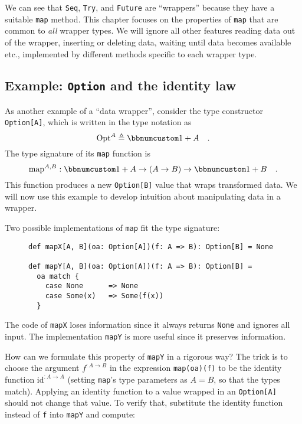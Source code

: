 We can see that \lstinline!Seq!, \lstinline!Try!, and \lstinline!Future!
are \textsf{``}wrappers\textsf{''} because they have a suitable \lstinline!map! method.
This chapter focuses on the properties of \lstinline!map! that are
common to \emph{all} wrapper types. We will ignore all other features
\textemdash{} reading data out of the wrapper, inserting or deleting
data, waiting until data becomes available etc., \textemdash{} implemented
by different methods specific to each wrapper type.

\subsection{Example: \texttt{Option} and the identity law\label{subsec:f-Example:-Option-and}}

As another example of a \textsf{``}data wrapper\textsf{''}, consider the type constructor
\lstinline!Option[A]!, which is written in the type notation as 
\[
\text{Opt}^{A}\triangleq\bbnum 1+A\quad.
\]
The type signature of its \lstinline!map! function is
\[
\text{map}^{A,B}:\bbnum 1+A\rightarrow\left(A\rightarrow B\right)\rightarrow\bbnum 1+B\quad.
\]
This function produces a new \lstinline!Option[B]! value that wraps
transformed data. We will now use this example to develop intuition
about manipulating data in a wrapper.

Two possible implementations of \lstinline!map! fit the type signature:

\begin{wrapfigure}{l}{0.585\columnwidth}%
\vspace{-0.7\baselineskip}
\begin{lstlisting}
def mapX[A, B](oa: Option[A])(f: A => B): Option[B] = None

def mapY[A, B](oa: Option[A])(f: A => B): Option[B] =
  oa match {
    case None      => None
    case Some(x)   => Some(f(x))
  }
\end{lstlisting}
\vspace{-1\baselineskip}
\end{wrapfigure}%

\noindent The code of \lstinline!mapX! loses information
since it always returns \lstinline!None! and ignores all input. The
implementation \lstinline!mapY! is more useful since it preserves
information. 

How can we formulate this property of \lstinline!mapY! in a rigorous
way? The trick is to choose the argument $f^{:A\rightarrow B}$ in
the expression \lstinline!map(oa)(f)! to be the identity function
$\text{id}^{:A\rightarrow A}$ (setting \lstinline!map!\textsf{'}s type parameters
as $A=B$, so that the types match). Applying an identity function
to a value wrapped in an \lstinline!Option[A]! should not change
that value. To verify that, substitute the identity function instead
of \lstinline!f! into \lstinline!mapY! and compute:

